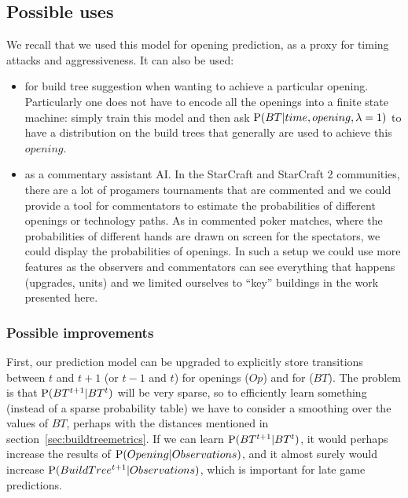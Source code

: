 \subsection{Possible uses}
We recall that we used this model for opening prediction, as a proxy for timing attacks and aggressiveness. It can also be used:
\begin{itemize}
    \item for build tree suggestion when wanting to achieve a particular opening. Particularly one does not have to encode all the openings into a finite state machine: simply train this model and then ask $\mathrm{P}(BT|time,opening,\lambda=1)$ to have a distribution on the build trees that generally are used to achieve this $opening$.
    \item as a commentary assistant AI. In the StarCraft and StarCraft 2 communities, there are a lot of progamers tournaments that are commented and we could provide a tool for commentators to estimate the probabilities of different openings or technology paths. As in commented poker matches, where the probabilities of different hands are drawn on screen for the spectators, we could display the probabilities of openings. In such a setup we could use more features as the observers and commentators can see everything that happens (upgrades, units) and we limited ourselves to ``key'' buildings in the work presented here.
\end{itemize}

\subsubsection{Possible improvements}
\label{sec:openingspossibleimprovements}

First, our prediction model can be upgraded to explicitly store transitions between $t$ and $t+1$ (or $t-1$ and $t$) for openings ($Op$) and for  ($BT$). The problem is that $\mathrm{P}(BT^{t+1}|BT^t)$ will be very sparse, so to efficiently learn something (instead of a sparse probability table) we have to consider a smoothing over the values of $BT$, perhaps with the distances mentioned in section~\ref{sec:buildtreemetrics}. If we can learn $\mathrm{P}(BT^{t+1}|BT^t)$, it would perhaps increase the results of $\mathrm{P}(Opening|Observations)$, and it almost surely would increase $\mathrm{P}(BuildTree^{t+1}|Observations)$, which is important for late game predictions. 


